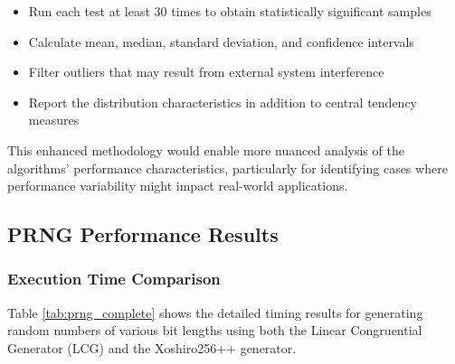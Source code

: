 \begin{itemize}
    \item Run each test at least 30 times to obtain statistically significant samples
    \item Calculate mean, median, standard deviation, and confidence intervals
    \item Filter outliers that may result from external system interference
    \item Report the distribution characteristics in addition to central tendency measures
\end{itemize}

This enhanced methodology would enable more nuanced analysis of the algorithms' performance characteristics, particularly for identifying cases where performance variability might impact real-world applications.

\subsection{PRNG Performance Results}

\subsubsection{Execution Time Comparison}

Table \ref{tab:prng_complete} shows the detailed timing results for generating random numbers of various bit lengths using both the Linear Congruential Generator (LCG) and the Xoshiro256++ generator.

